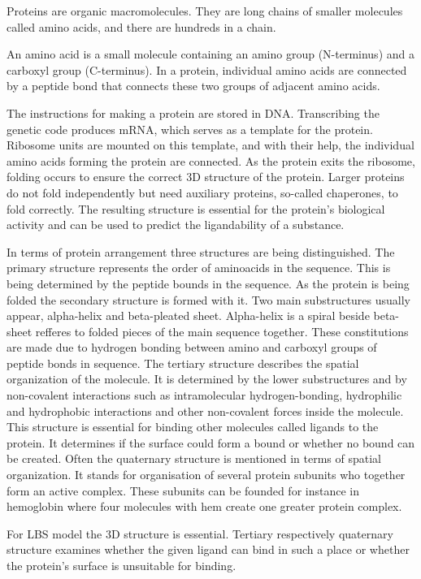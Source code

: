 Proteins are organic macromolecules. They are long chains of smaller molecules called amino acids, and there are hundreds in a chain.

An amino acid is a small molecule containing an amino group (N-terminus) and a carboxyl group (C-terminus). In a protein, individual amino acids are connected by a peptide bond that connects these two groups of adjacent amino acids.

The instructions for making a protein are stored in DNA. Transcribing the genetic code produces mRNA, which serves as a template for the protein. Ribosome units are mounted on this template, and with their help, the individual amino acids forming the protein are connected. As the protein exits the ribosome, folding occurs to ensure the correct 3D structure of the protein. Larger proteins do not fold independently but need auxiliary proteins, so-called chaperones, to fold correctly. The resulting structure is essential for the protein's biological activity and can be used to predict the ligandability of a substance.

In terms of protein arrangement three structures are being distinguished. The primary structure represents the order of aminoacids in the sequence. This is being determined by the peptide bounds in the sequence.
As the protein is being folded the secondary structure is formed with it. Two main substructures usually appear, alpha-helix and beta-pleated sheet. Alpha-helix is a spiral beside beta-sheet refferes to folded pieces of the main sequence together. These constitutions are made due to hydrogen bonding between amino and carboxyl groups of peptide bonds in sequence.
The tertiary structure describes the spatial organization of the molecule. It is determined by the lower substructures and by non-covalent interactions such as intramolecular hydrogen-bonding, hydrophilic and hydrophobic interactions and other non-covalent forces inside the molecule. This structure is essential for binding other molecules called ligands to the protein. It determines if the surface could form a bound or whether no bound can be created.
Often the quaternary structure is mentioned in terms of spatial organization. It stands for organisation of several protein subunits who together form an active complex. These subunits can be founded for instance in hemoglobin where four molecules with hem create one greater protein complex. 

For LBS model the 3D structure is essential. Tertiary respectively quaternary structure examines whether the given ligand can bind in such a place or whether the protein's surface is unsuitable for binding.


